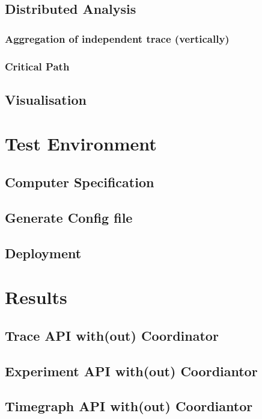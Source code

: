 \subsection{Distributed Analysis}

\subsubsection{Aggregation of independent trace (vertically)}

\subsubsection{Critical Path}

\subsection{Visualisation}

\section{Test Environment}

\subsection{Computer Specification}

\subsection{Generate Config file}

\subsection{Deployment}

\section{Results}

\subsection{Trace API with(out) Coordinator}

\subsection{Experiment API with(out) Coordiantor}

\subsection{Timegraph API with(out) Coordiantor}

